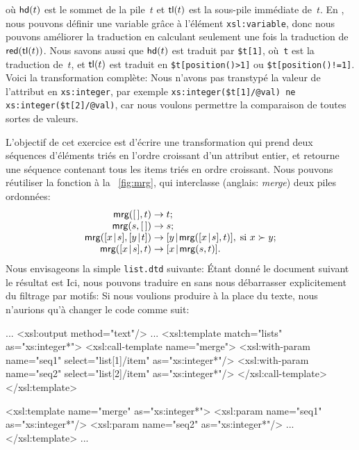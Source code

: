 où \(\textsf{hd}(t)\)  est le sommet de la
pile~\(t\) et \(\textsf{tl}(t)\)  est la sous-pile
immédiate de~\(t\). En \XSLT, nous pouvons définir une variable grâce
à l'élément \texttt{xsl:variable}, donc nous pouvons améliorer la
traduction en calculant seulement une fois la traduction de
\(\textsf{red}(\textsf{tl}(t))\). Nous savons aussi que \(\textsf{hd}(t)\) est
traduit par \texttt{\$t[1]}, où~\texttt{t} est la traduction de~\(t\),
et \(\textsf{tl}(t)\) est traduit en \texttt{\$t[position()>1]} ou
\texttt{\$t[position()!=1]}. Voici la transformation complète:
\noindent Nous n'avons pas transtypé la valeur de l'attribut en
\texttt{xs:integer}, par exemple \texttt{xs:integer(\$t[1]/@val) ne
  xs:integer(\$t[2]/@val)}, car nous voulons permettre la comparaison
de toutes sortes de valeurs.


\label{par:merging}

L'objectif de cet exercice est d'écrire une transformation \XSLT qui
prend deux séquences d'éléments triés en l'ordre croissant d'un
attribut entier, et retourne une séquence contenant tous les items
triés en ordre croissant. Nous pouvons réutiliser la fonction
 à la \fig~\vref{fig:mrg}, qui interclasse (anglais:
\emph{merge}) deux piles ordonnées:
\begin{equation*}
\begin{array}{r@{\;}l@{\;}l}
\fun{mrg}(\el,t)         & \rightarrow & t;\\
\fun{mrg}(s,\el)         & \rightarrow & s;\\
\fun{mrg}(\cons{x}{s},\cons{y}{t}) & \rightarrow
& \cons{y}{\fun{mrg}(\cons{x}{s},t)},\;\text{si \(x \succ y\)};\\
\fun{mrg}(\cons{x}{s},t) & \rightarrow & \cons{x}{\fun{mrg}(s,t)}.
\end{array}
\end{equation*}
Nous envisageons la simple \DTD \texttt{list.dtd} suivante:
\noindent Étant donné le document \XML suivant
\noindent le résultat est
Ici, nous pouvons traduire  en \XSLT sans nous débarrasser
explicitement du filtrage par motifs:
\noindent Si nous voulions produire à la place du texte, nous
n'aurions qu'à changer le code comme suit:
\begin{sverb}
...
  <xsl:output method="text"/>
...
  <xsl:template match="lists" as="xs:integer*">
    <xsl:call-template name="merge">
      <xsl:with-param name="seq1" select="list[1]/item"
                                  as="xs:integer*"/>
      <xsl:with-param name="seq2" select="list[2]/item"
                                  as="xs:integer*"/>
    </xsl:call-template>
  </xsl:template>

  <xsl:template name="merge" as="xs:integer*">
    <xsl:param name="seq1" as="xs:integer*"/>
    <xsl:param name="seq2" as="xs:integer*"/>
    ...
  </xsl:template>
...
\end{sverb}


